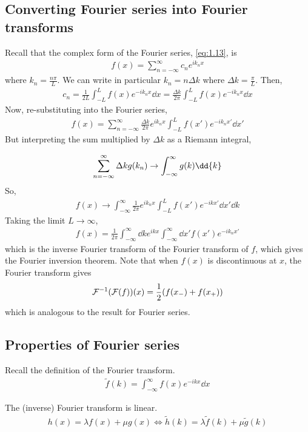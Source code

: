 \subsection{Converting Fourier series into Fourier transforms}
Recall that the complex form of the Fourier series, \cref{eq:1.13}, is
\begin{align*}
	f(x) = \sum_{n=-\infty}^\infty c_n e^{ik_n x}
\end{align*}
where $k_n = \frac{n\pi}{L}$.
We can write in particular $k_n = n \Delta k$ where $\Delta k = \frac{\pi}{L}$.
Then,
\begin{align*}
	c_n = \frac{1}{2L} \int_{-L}^L f(x) e^{-ik_n x} \dd{x} = \frac{\Delta k}{2\pi} \int_{-L}^L f(x) e^{-ik_n x}\dd{x}
\end{align*}
Now, re-substituting into the Fourier series,
\begin{align*}
	f(x) = \sum_{n=-\infty}^\infty \frac{\Delta k}{2\pi} e^{i k_n x} \int_{-L}^L f(x') e^{-ik_n x'} \dd{x'}
\end{align*}
But interpreting the sum multiplied by $\Delta k$ as a Riemann integral,
\addtocounter{equation}{-1}
\begin{subequations}
	\addtocounter{equation}{1}
	\begin{align} \label{eq:8.6b}
		\sum_{n=-\infty}^{\infty} \Delta k g(k_n) \to \int_{-\infty}^{\infty} g(k) \dd{k}
	\end{align} 
\end{subequations}
So,
\begin{align*}
	f(x) \to \int_{-\infty}^\infty \frac{1}{2\pi} e^{i k_n x} \int_{-L}^L f(x') e^{-ik x'} \dd{x'} \dd{k}
\end{align*}
Taking the limit $L \to \infty$,
\begin{align*}
	f(x) = \frac{1}{2\pi} \int_{-\infty}^\infty \dd{k} e^{i k x} \int_{-\infty}^\infty \dd{x'} f(x') e^{-ik_n x'}
\end{align*}
which is the inverse Fourier transform of the Fourier transform of $f$, which gives the Fourier inversion theorem.
Note that when $f(x)$ is discontinuous at $x$, the Fourier transform gives
\begin{align} \label{eq:8.7}
	\mathcal F^{-1}(\mathcal F(f))(x) = \frac{1}{2}(f(x_-) + f(x_+))
\end{align}
which is analogous to the result for Fourier series.

\subsection{Properties of Fourier series}
Recall the definition of the Fourier transform.
\begin{align*}
	\widetilde f(k) = \int_{-\infty}^\infty f(x) e^{-ikx} \dd{x}
\end{align*}
\begin{proposition}[Linearity]
	The (inverse) Fourier transform is linear.
	\begin{align} \label{eq:8.8}
		h(x) = \lambda f(x) + \mu g(x) \iff \widetilde h(k) = \lambda \widetilde f(k) + \mu \widetilde g(k)
	\end{align}
\end{proposition} 

